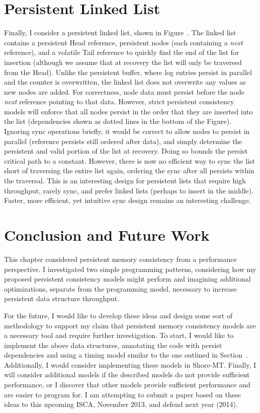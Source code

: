 \section{Persistent Linked List}
\label{sec:PMC_patterns:LinkedList}



Finally, I consider a persistent linked list, shown in Figure~.
The linked list contains a persistent Head reference, persistent nodes (each containing a \emph{next} reference), and a volatile Tail reference to quickly find the end of the list for insertion (although we assume that at recovery the list will only be traversed from the Head).
Unlike the persistent buffer, where log entries persist in parallel and the counter is overwritten, the linked list does not overwrite any values as new nodes are added.
For correctness, node data must persist before the node \emph{next} reference pointing to that data.
However, strict persistent consistency models will enforce that all nodes persist in the order that they are inserted into the list (dependencies shown as dotted lines in the bottom of the Figure).
Ignoring sync operations briefly, it would be correct to allow nodes to persist in parallel (reference persists still ordered after data), and simply determine the persistent and valid portion of the list at recovery.
Doing so bounds the persist critical path to a constant.
However, there is now no efficient way to sync the list short of traversing the entire list again, ordering the sync after all persists within the traversal.
This is an interesting design for persistent lists that require high throughput, rarely sync, and prefer linked lists (perhaps to insert in the middle).
Faster, more efficient, yet intuitive sync design remains an interesting challenge.

\section{Conclusion and Future Work}
\label{sec:PMC_patterns:Conclusion}

This chapter considered persistent memory consistency from a performance perspective.
I investigated two simple programming patterns, considering how my proposed persistent consistency models might perform and imagining additional optimizations, separate from the programming model, necessary to increase persistent data structure throughput.

For the future, I would like to develop these ideas and design some sort of methodology to support my claim that persistent memory consistency models are a necessary tool and require further investigation.
To start, I would like to implement the above data structures, annotating the code with persist dependencies and using a timing model similar to the one outlined in Section~.
Additionally, I would consider implementing these models in Shore-MT.
Finally, I will consider additional models if the described models do not provide sufficient performance, or I discover that other models provide sufficient performance and are easier to program for.
I am attempting to submit a paper based on these ideas to this upcoming ISCA, November 2013, and defend next year (2014).

